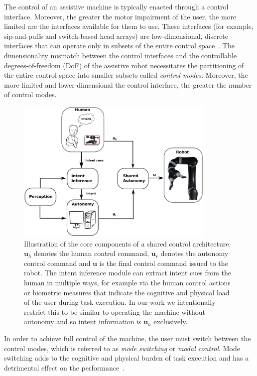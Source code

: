 \documentclass[natbib, twocolumn]{svjour3}          %
\begin{document}
The control of an assistive machine is typically enacted through a control interface. Moreover, the greater the motor impairment of the user, the more limited are the interfaces available for them to use. These interfaces (for example, sip-and-puffs and switch-based head arrays) are low-dimensional, discrete interfaces that can operate only in subsets of the entire control space~\citep{simpson2008tooth, nuttin2002selection}. 
The dimensionality mismatch between the control interfaces and the controllable degrees-of-freedom (DoF) of the assistive robot necessitates the partitioning of the entire control space into smaller subsets called \textit{control modes}. Moreover, the more limited and lower-dimensional the control interface, the greater the number of control modes. 
\begin{figure}[t!]
	\includegraphics[keepaspectratio, width = 0.85\textwidth, center]{Fig1.eps}
	\caption{Illustration of the core components of a shared control architecture. $\boldsymbol{u}_h$ denotes the human control command, $\boldsymbol{u}_r$ denotes the autonomy control command and $\boldsymbol{u}$ is the final control command issued to the robot. The intent inference module can extract intent cues from the human in multiple ways, for example via the human control actions or biometric measures that indicate the cognitive and physical load of the user during task execution. In our work we intentionally restrict this to be similar to operating the machine without autonomy and so intent information is $\boldsymbol{u}_h$ exclusively. }
	\label{fig:shared_control}
\end{figure}
In order to achieve full control of the machine, the user must switch between the control modes, which is referred to as \textit{mode switching} or \textit{modal control}. Mode switching adds to the cognitive and physical burden of task execution and has a detrimental effect on the performance~\citep{eftring1999technical}. 
\end{document}
